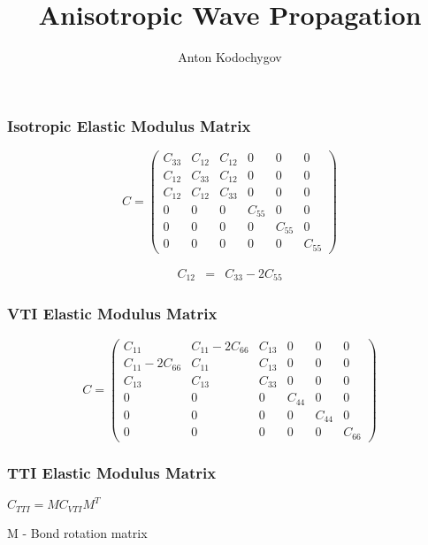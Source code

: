\documentclass{beamer}
\begin{document}
\title {Anisotropic Wave Propagation}

\author {Anton Kodochygov}

\begin{frame}
\titlepage
\end{frame}
\begin{frame}

\frametitle{Isotropic Elastic Modulus Matrix}

\[ C =  \left( \begin{array}{cccccc}
C_{33} & C_{12} & C_{12} & 0 & 0 & 0 \\
C_{12} & C_{33} & C_{12} & 0 & 0 & 0 \\
C_{12} & C_{12} & C_{33} & 0 & 0 & 0 \\
0 & 0 & 0 & C_{55} & 0 & 0 \\
0 & 0 & 0 & 0 & C_{55} & 0 \\
0 & 0 & 0 & 0 & 0 & C_{55} \end{array} \right)\] 

\begin{eqnarray}
C_{12} &=& C_{33} - 2 C_{55} \nonumber
\end{eqnarray}

\end{frame}

\begin{frame}
\frametitle{VTI Elastic Modulus Matrix}

\[ C =  \left( \begin{array}{cccccc}
C_{11} & C_{11}-2C_{66} & C_{13} & 0 & 0 & 0 \\
C_{11}-2C_{66} & C_{11} & C_{13} & 0 & 0 & 0 \\
C_{13} & C_{13} & C_{33} & 0 & 0 & 0 \\
0 & 0 & 0 & C_{44} & 0 & 0 \\
0 & 0 & 0 & 0 & C_{44} & 0 \\
0 & 0 & 0 & 0 & 0 & C_{66} \end{array} \right)\] 

\end{frame}

\begin{frame}
\frametitle{TTI Elastic Modulus Matrix}

$C_{TTI} = M C_{VTI} M^T$

M - Bond rotation matrix

\end{frame}
\end{document}
